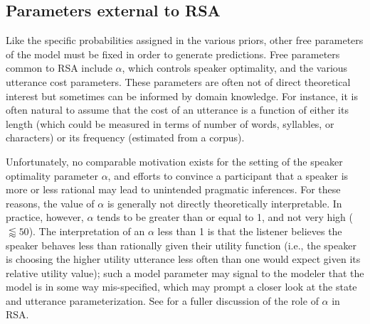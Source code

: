 \documentclass{sp}
\newcommand{\gcs}[1]{\textcolor{blue}{[gcs: #1]}}
\newcommand{\mf}[1]{\textcolor{orange}{[mf: #1]}}
\newcommand{\mht}[1]{\textcolor{purple}{[mht: #1]}}
\begin{document}


%


\subsection{Parameters external to RSA}

Like the specific probabilities assigned in the various priors, other free parameters of the model must be fixed in order to generate predictions. Free parameters common to RSA include $\alpha$, which controls speaker optimality, and the various utterance cost parameters. These parameters are often not of direct theoretical interest but sometimes can be informed by domain knowledge. For instance, it is often natural to assume that the cost of an utterance is a function of either its length  (which could be measured in terms of number of words, syllables, or characters) or its frequency (estimated from a corpus). 

Unfortunately,  no comparable motivation exists for the setting of the speaker optimality parameter $\alpha$, and efforts to convince a participant that a speaker is more or less rational may lead to unintended pragmatic inferences. For these reasons, the value of $\alpha$ is generally not directly theoretically interpretable. In practice, however, $\alpha$ tends to be greater than or equal to 1, and not very high ($\lessapprox 50$). The interpretation of an $\alpha$ less than 1 %
is that the listener believes the speaker behaves less than rationally given their utility function (i.e., the speaker is choosing the higher utility utterance less often than one would expect given its relative utility value); such a model parameter may signal to the modeler that the model is in some way mis-specified, which may prompt a closer look at the state and utterance parameterization.  See \cite{zaslavsky2020rate} for a fuller discussion of the role of $\alpha$ in RSA.
\end{document}
